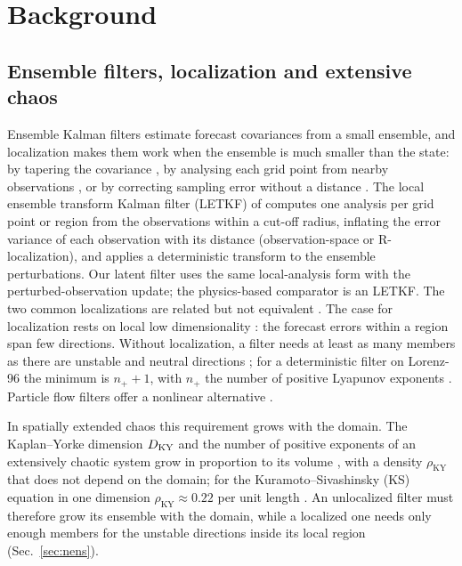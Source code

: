 \section{Background}
\label{sec:background}

\subsection{Ensemble filters, localization and extensive chaos}
\label{sec:bg_da}

Ensemble Kalman filters
\citep{burgers1998,houtekamermitchell1998,whitakerhamill2002} estimate
forecast covariances from a small ensemble, and localization makes them
work when the ensemble is much smaller than the state: by tapering the
covariance \citep{houtekamermitchell2001,gaspari1999}, by analysing each
grid point from nearby observations
\citep{ott2004,hunt2007}, or by correcting sampling error without a
distance \citep{anderson2012}. The local ensemble transform Kalman filter
(LETKF) of \citet{hunt2007} computes one analysis per grid point or region
from the observations within a cut-off radius, inflating the error variance
of each observation with its distance (observation-space or
R-localization), and applies a deterministic transform to the ensemble
perturbations. Our latent filter uses the same local-analysis form with the
perturbed-observation update; the physics-based comparator is an LETKF. The two common localizations are
related but not equivalent \citep{sakovbertino2011,greybush2011}. The case
for localization rests on local low dimensionality \citep{patil2001}: the
forecast errors within a region span few directions. Without
localization, a filter needs at least as many members as there are
unstable and neutral directions
\citep{trevisan2004,gurumoorthy2017,bocquetcarrassi2017}; for a
deterministic filter on Lorenz-96 the minimum is $n_+ + 1$, with $n_+$ the
number of positive Lyapunov exponents \citep{takeda2026}. Particle flow
filters offer a nonlinear alternative \citep{huvanleeuwen2021}.

In spatially extended chaos this requirement grows with the domain. The
Kaplan--Yorke dimension $D_{\mathrm{KY}}$ \citep{kaplanyorke1979} and the number of
positive exponents of an extensively chaotic system grow in proportion to
its volume \citep{ruelle1982,manneville1985,egolfgreenside1994}, with a
density $\rho_{\mathrm{KY}}$ that does not depend on the domain; for the
Kuramoto--Sivashinsky (KS) equation in one dimension $\rho_{\mathrm{KY}}\approx0.22$ per
unit length \citep{edson2019}. An unlocalized filter must therefore grow
its ensemble with the domain, while a localized one needs only enough
members for the unstable directions inside its local region
(Sec.~\ref{sec:nens}).


